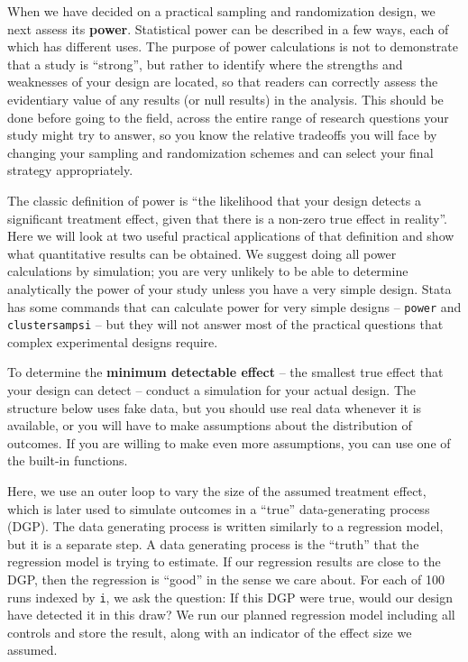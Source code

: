 When we have decided on a practical sampling and randomization design,
we next assess its \textbf{power}.
Statistical power can be described in a few ways,
each of which has different uses.
The purpose of power calculations is not to
demonstrate that a study is ``strong'',
but rather to identify where the strengths and weaknesses
of your design are located, so that readers
can correctly assess the evidentiary value of
any results (or null results) in the analysis.
This should be done before going to the field,
across the entire range of research questions
your study might try to answer,
so you know the relative tradeoffs you will face
by changing your sampling and randomization schemes
and can select your final strategy appropriately.

The classic definition of power is
``the likelihood that your design detects a significant treatment effect,
given that there is a non-zero true effect in reality''.
Here we will look at two useful practical applications
of that definition and show what quantitative results can be obtained.
We suggest doing all power calculations by simulation;
you are very unlikely to be able to determine analytically
the power of your study unless you have a very simple design.
Stata has some commands that can calculate power for
very simple designs -- \texttt{power} and \texttt{clustersampsi} --
but they will not answer most of the practical questions
that complex experimental designs require.

To determine the \textbf{minimum detectable effect}
-- the smallest true effect that your design can detect --
conduct a simulation for your actual design.
The structure below uses fake data,
but you should use real data whenever it is available,
or you will have to make assumptions about the distribution of outcomes.
If you are willing to make even more assumptions,
you can use one of the built-in functions.

Here, we use an outer loop to vary the size of the assumed treatment effect,
which is later used to simulate outcomes in a ``true''
data-generating process (DGP).
The data generating process is written similarly to a
regression model, but it is a separate step.
A data generating process is the ``truth''
that the regression model is trying to estimate.
If our regression results are close to the DGP,
then the regression is ``good'' in the sense we care about.
For each of 100 runs indexed by \texttt{i},
we ask the question: If this DGP were true,
would our design have detected it in this draw?
We run our planned regression model including all controls and store the result,
along with an indicator of the effect size we assumed.

